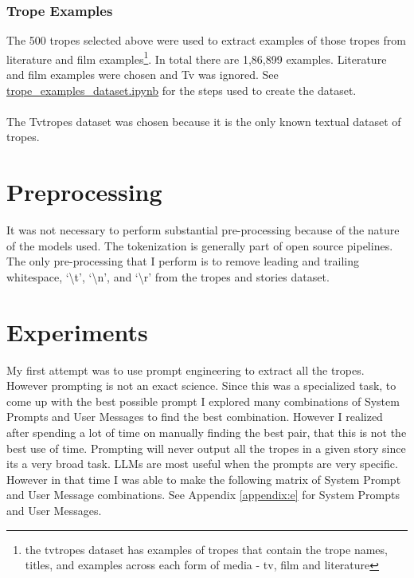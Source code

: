 \documentclass[11pt]{article}
\begin{document}
\subsubsection{Trope Examples}
The 500 tropes selected above were used to extract examples of those tropes from literature and film examples\footnote[1]{the tvtropes dataset has examples of tropes that contain the trope names, titles, and examples across each form of media - tv, film and literature}. In total there are 1,86,899  examples. Literature and film examples were chosen and Tv was ignored. See \href{https://github.com/armsp/trama/blob/main/trope_examples_dataset.ipynb}{trope\_examples\_dataset.ipynb} for the steps used to create the dataset.
\\
\\
\noindent The Tvtropes dataset was chosen because it is the only known textual dataset of tropes.

\section{Preprocessing}
It was not necessary to perform substantial pre-processing because of the nature of the models used. The tokenization is generally part of open source pipelines. The only pre-processing that I perform is to remove leading and trailing whitespace,  `\textbackslash t', `\textbackslash n', and `\textbackslash r' from the tropes and stories dataset. 

\section{Experiments}
My first attempt was to use prompt engineering to extract all the tropes. However prompting is not an exact science. Since this was a specialized task, to come up with the best possible prompt I explored many combinations of System Prompts and User Messages to find the best combination. However I realized after spending a lot of time on manually finding the best pair, that this is not the best use of time. Prompting will never output all the tropes in a given story since its a very broad task. LLMs are most useful when the prompts are very specific. However in that time I was able to make the following matrix of System Prompt and User Message combinations. See Appendix \ref{appendix:e} for System Prompts and User Messages.
\end{document}

